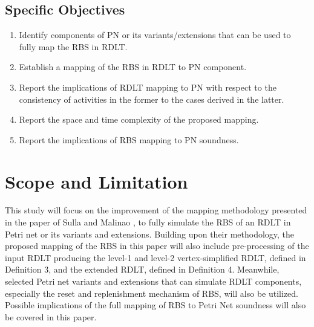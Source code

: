 \documentclass[12pt]{article}
\begin{document}
    \subsection{Specific Objectives}
    \begin{enumerate}
        \item Identify components of PN or its variants/extensions that can be used to fully map the RBS in RDLT.
        \item Establish a mapping of the RBS in RDLT to PN component.
        \item Report the implications of RDLT mapping to PN with respect to the consistency of activities in the former to the cases derived in the latter.
        \item Report the space and time complexity of the proposed mapping.
        \item Report the implications of RBS mapping to PN soundness.
    \end{enumerate}

    \section{Scope and Limitation}
    This study will focus on the improvement of the mapping methodology presented in the paper of Sulla and Malinao \cite{sulla-malinao}, to fully simulate the RBS of an RDLT in Petri net or its variants and extensions. Building upon their methodology, the proposed mapping of the RBS in this paper will also include pre-processing of the input RDLT producing the level-1 and level-2 vertex-simplified RDLT, defined in Definition 3, and the extended RDLT, defined in Definition 4. Meanwhile, selected Petri net variants and extensions that can simulate RDLT components, especially the reset and replenishment mechanism of RBS, will also be utilized. Possible implications of the full mapping of RBS to Petri Net soundness will also be covered in this paper.

\end{document}
